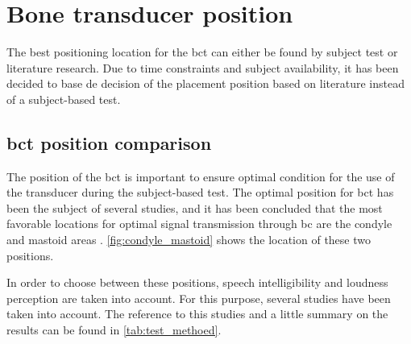 \section{Bone transducer position}
\label{sec:bc_pos}

The best positioning location for the \gls{bct} can either be found by subject test or literature research. Due to time constraints and subject availability, it has been decided to base de decision of the placement position based on literature instead of a subject-based test.

\subsection{\gls{bct} position comparison}
The position of the \gls{bct} is important to ensure optimal condition for the use of the transducer during  the subject-based test. The optimal position for \gls{bct} has been the subject of several studies, and it has been concluded that the most favorable locations for optimal signal transmission through \gls{bc} are the condyle and mastoid areas \citep{cat_test}. \autoref{fig:condyle_mastoid} shows the location of these two positions.


In order to choose between these positions, speech intelligibility and loudness perception are taken into account. For this purpose, several studies have been taken into account. The reference to this studies and a little summary on the results can be found in  \autoref{tab:test_methoed}.

